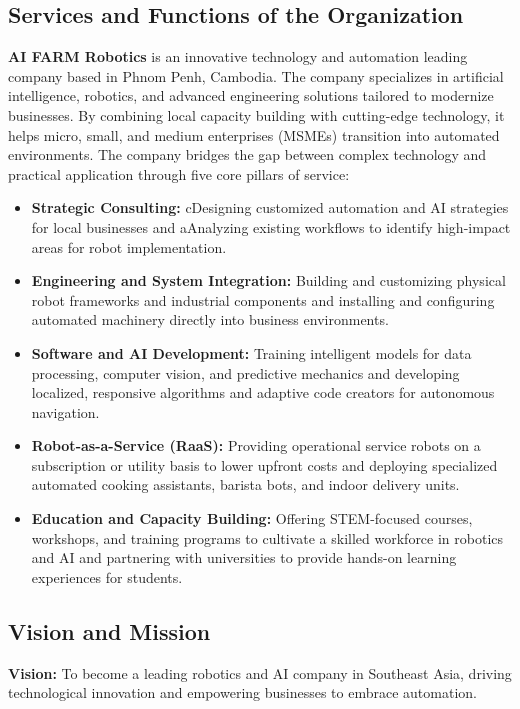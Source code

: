 \subsection{Services and Functions of the Organization}

\textbf{AI FARM Robotics} is an innovative technology and automation leading company based in Phnom Penh, Cambodia. The company specializes in artificial intelligence, robotics, and advanced engineering solutions tailored to modernize businesses. By combining local capacity building with cutting-edge technology, it helps micro, small, and medium enterprises (MSMEs) transition into automated environments. The company bridges the gap between complex technology and practical application through five core pillars of service:

\begin{itemize}        
    \item \textbf{Strategic Consulting:} cDesigning customized automation and AI strategies for local businesses and aAnalyzing existing workflows to identify high-impact areas for robot implementation.
    \item \textbf{Engineering and System Integration:} Building and customizing physical robot frameworks and industrial components and installing and configuring automated machinery directly into business environments.
    \item \textbf{Software and AI Development:} Training intelligent models for data processing, computer vision, and predictive mechanics and developing localized, responsive algorithms and adaptive code creators for autonomous navigation.
    \item \textbf{Robot-as-a-Service (RaaS):} Providing operational service robots on a subscription or utility basis to lower upfront costs and deploying specialized automated cooking assistants, barista bots, and indoor delivery units.
    \item \textbf{Education and Capacity Building:} Offering STEM-focused courses, workshops, and training programs to cultivate a skilled workforce in robotics and AI and partnering with universities to provide hands-on learning experiences for students.
\end{itemize}

\subsection{Vision and Mission}

\textbf{Vision:} To become a leading robotics and AI company in Southeast Asia, driving technological innovation and empowering businesses to embrace automation.

